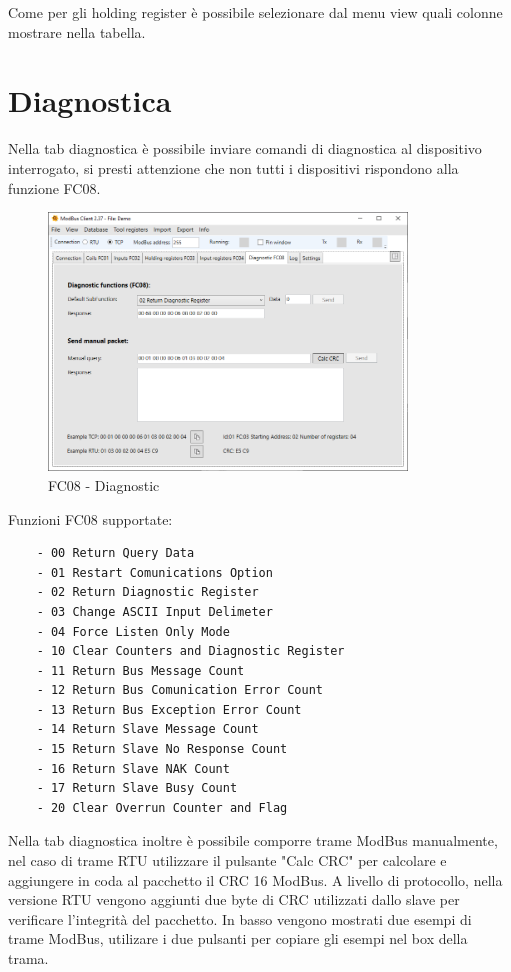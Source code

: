 Come per gli holding register è possibile selezionare dal menu view quali colonne mostrare nella tabella.

\newpage
\section{Diagnostica}

Nella tab diagnostica è possibile inviare comandi di diagnostica al dispositivo interrogato, 
si presti attenzione
che non tutti i dispositivi rispondono alla funzione FC08.

\begin{figure}[H]
\centering
\includegraphics[width=0.85\textwidth]{../Img/Modbus_Client_Diagnostic_00.PNG}
\caption{FC08 - Diagnostic}
\end{figure}

Funzioni FC08 supportate:

\begin{verbatim}
    - 00 Return Query Data
    - 01 Restart Comunications Option
    - 02 Return Diagnostic Register
    - 03 Change ASCII Input Delimeter
    - 04 Force Listen Only Mode
    - 10 Clear Counters and Diagnostic Register
    - 11 Return Bus Message Count
    - 12 Return Bus Comunication Error Count
    - 13 Return Bus Exception Error Count
    - 14 Return Slave Message Count
    - 15 Return Slave No Response Count
    - 16 Return Slave NAK Count
    - 17 Return Slave Busy Count
    - 20 Clear Overrun Counter and Flag
\end{verbatim}

Nella tab diagnostica inoltre è possibile comporre trame ModBus manualmente, 
nel caso di trame RTU utilizzare il pulsante "Calc CRC" per calcolare e aggiungere in coda al
pacchetto il CRC 16 ModBus.
A livello di protocollo, nella versione RTU vengono aggiunti due byte di CRC
utilizzati dallo slave per verificare l'integrità del pacchetto.
In basso vengono mostrati due esempi di trame ModBus, 
utilizare i due pulsanti per copiare gli esempi nel box della trama.